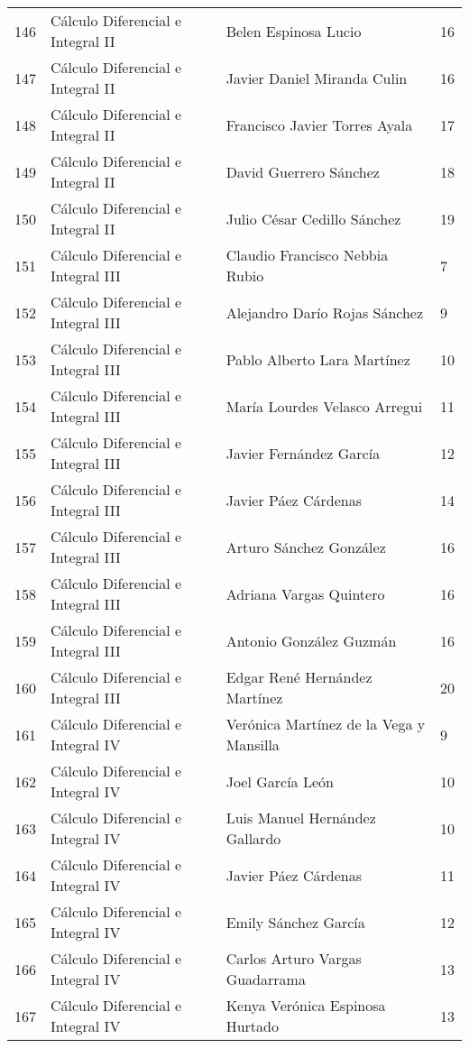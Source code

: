 \begin{table}[ht]
\begin{tabular}{rlll}
  146 & Cálculo Diferencial e Integral II & Belen Espinosa Lucio & 16 \\ 
  147 & Cálculo Diferencial e Integral II & Javier Daniel Miranda Culin & 16 \\ 
  148 & Cálculo Diferencial e Integral II & Francisco Javier Torres Ayala & 17 \\ 
  149 & Cálculo Diferencial e Integral II & David Guerrero Sánchez & 18 \\ 
  150 & Cálculo Diferencial e Integral II & Julio César Cedillo Sánchez & 19 \\ 
  151 & Cálculo Diferencial e Integral III & Claudio Francisco Nebbia Rubio & 7 \\ 
  152 & Cálculo Diferencial e Integral III & Alejandro Darío Rojas Sánchez & 9 \\ 
  153 & Cálculo Diferencial e Integral III & Pablo Alberto Lara Martínez & 10 \\ 
  154 & Cálculo Diferencial e Integral III & María Lourdes Velasco Arregui & 11 \\ 
  155 & Cálculo Diferencial e Integral III & Javier Fernández García & 12 \\ 
  156 & Cálculo Diferencial e Integral III & Javier Páez Cárdenas & 14 \\ 
  157 & Cálculo Diferencial e Integral III & Arturo Sánchez González & 16 \\ 
  158 & Cálculo Diferencial e Integral III & Adriana Vargas Quintero & 16 \\ 
  159 & Cálculo Diferencial e Integral III & Antonio González Guzmán & 16 \\ 
  160 & Cálculo Diferencial e Integral III & Edgar René Hernández Martínez & 20 \\ 
  161 & Cálculo Diferencial e Integral IV & Verónica Martínez de la Vega y Mansilla & 9 \\ 
  162 & Cálculo Diferencial e Integral IV & Joel García León & 10 \\ 
  163 & Cálculo Diferencial e Integral IV & Luis Manuel Hernández Gallardo & 10 \\ 
  164 & Cálculo Diferencial e Integral IV & Javier Páez Cárdenas & 11 \\ 
  165 & Cálculo Diferencial e Integral IV & Emily Sánchez García & 12 \\ 
  166 & Cálculo Diferencial e Integral IV & Carlos Arturo Vargas Guadarrama & 13 \\ 
  167 & Cálculo Diferencial e Integral IV & Kenya Verónica Espinosa Hurtado & 13 \\ 

\end{tabular}
\end{table}
